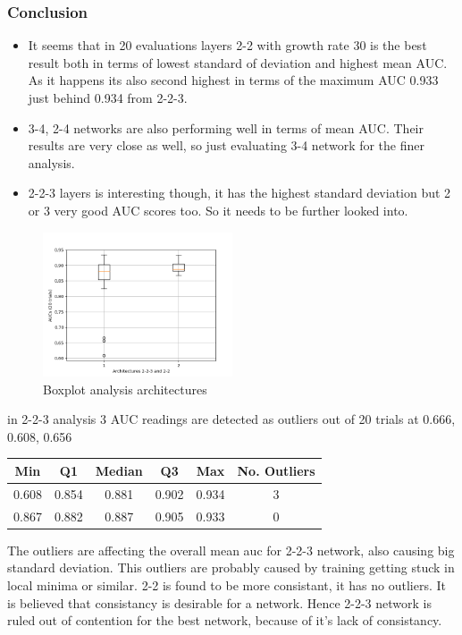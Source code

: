\subsubsection{Conclusion}
\begin{itemize}
 \item It seems that in 20 evaluations layers 2-2 with growth rate 30 is the best result both in terms of lowest standard of deviation and highest mean AUC. As it happens its also second highest in terms of the 
 maximum AUC 0.933 just behind 0.934 from 2-2-3.
 \item 3-4, 2-4 networks are also performing well in terms of mean AUC. Their results are very close as well, so just evaluating 3-4 network for the finer analysis.
 \item 2-2-3 layers is interesting though, it has the highest standard deviation but 2 or 3 very good AUC scores too. So it needs to be further looked into.
\end{itemize}

\begin{figure}[ht]
\centering
\includegraphics[width=0.5\textwidth]{images/densenet/arch_compare_boxplot.png}
\caption{Boxplot analysis architectures}
\label{fig:arch_compare_boxplot}
\end{figure}

in 2-2-3 analysis 3 AUC readings are detected as outliers out of 20 trials at 0.666, 0.608, 0.656
\begin{center}
 \begin{tabular}{||c c c c c c||} 
 \hline\hline
 Min & Q1 & Median & Q3 & Max & No. Outliers \\ [0.5ex] 
 \hline
 0.608 & 0.854 & 0.881 & 0.902 & 0.934 & 3 \\ 
 \hline
 0.867 & 0.882 & 0.887 & 0.905 & 0.933 & 0 \\
 \hline
\end{tabular}
\end{center}

The outliers are affecting the overall mean auc for 2-2-3 network, also causing big standard deviation. This outliers are probably caused by training getting stuck in local minima or similar. 2-2 is found to be more 
consistant, it has no outliers. It is believed that consistancy is desirable for a network. Hence 2-2-3 network is ruled out of contention for the best network, because of it's lack of consistancy.
